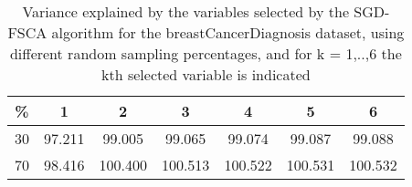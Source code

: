 \begin{table}
	\begin{center}
		\begin{tabular}{c c c c c c c}
			\% & 1 & 2 & 3 & 4 & 5 & 6 \\
			\hline
			30 & 97.211 & 99.005 & 99.065 & 99.074 & 99.087 & 99.088 \\
			70 & 98.416 & 100.400 & 100.513 & 100.522 & 100.531 & 100.532 \\
		\end{tabular}
	\end{center}
	\caption{Variance explained by the variables selected by the SGD-FSCA algorithm for the breastCancerDiagnosis dataset, using different random sampling percentages, and for k = 1,..,6 the kth selected variable is indicated}
\end{table}